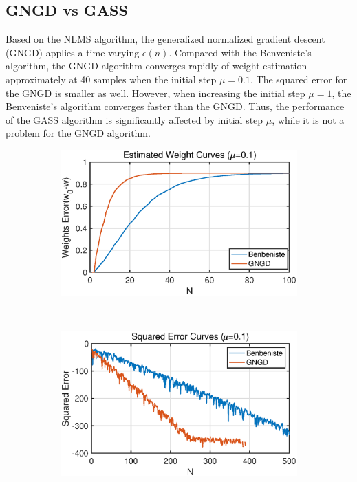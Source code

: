 \subsection{GNGD vs GASS}
Based on the NLMS algorithm, the generalized normalized gradient descent (GNGD) applies a time-varying $\epsilon(n)$. Compared with the Benveniste's algorithm, the GNGD algorithm converges rapidly of weight estimation approximately at 40 samples when the initial step $\mu=0.1$. The squared error
for the GNGD is smaller as well. However, when increasing the initial step $\mu=1$, the Benveniste's algorithm converges faster than the GNGD. Thus, the performance of the GASS algorithm is significantly affected by initial step $\mu$, while it is not a problem for the GNGD algorithm.
\begin{figure}[htbp]
     \centering
     \begin{subfigure}[b]{0.4\textwidth}
         \centering
         \includegraphics[width=\textwidth]{fig/22/22c1.eps}
     \end{subfigure}
     ~
     \begin{subfigure}[b]{0.4\textwidth}
         \centering
         \includegraphics[width=\textwidth]{fig/22/22c2.eps}

\end{subfigure}
\end{figure}
